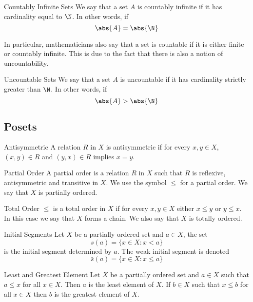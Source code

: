 \begin{defn}{Countably Infinite Sets}{} We say that a set $A$ is countably infinite if it has cardinality equal to $\N$. In other words, if $$\abs{A}=\abs{\N}$$
\end{defn}

In particular, mathematicians also say that a set is countable if it is either finite or countably infinite. This is due to the fact that there is also a notion of uncountability. 

\begin{defn}{Uncountable Sets}{} We say that a set $A$ is uncountable if it has cardinality strictly greater than $\N$. In other words, if $$\abs{A}>\abs{\N}$$
\end{defn}

\subsection{Posets}
\begin{defn}{Antisymmetric}{} A relation $R$ in $X$ is antisymmetric if for every $x,y\in X$, $(x,y)\in R$ and $(y,x)\in R$ implies $x=y$. 
\end{defn}

\begin{defn}{Partial Order}{} A partial order is a relation $R$ in $X$ such that $R$ is reflexive, antisymmetric and transitive in $X$. We use the symbol $\leq$ for a partial order. We say that $X$ is partially ordered. 
\end{defn}

\begin{defn}{Total Order}{} $\leq$ is a total order in $X$ if for every $x,y\in X$ either $x\leq y$ or $y\leq x$. In this case we say that $X$ forms a chain. We also say that $X$ is totally ordered. 
\end{defn}

\begin{defn}{Initial Segments}{} Let $X$ be a partially ordered set and $a\in X$, the set $$s(a)=\{x\in X:x<a\}$$ is the initial segment determined by $a$. The weak initial segment is denoted $$\bar{s}(a)=\{x\in X:x\leq a\}$$ 
\end{defn}

\begin{defn}{Least and Greatest Element}{} Let $X$ be a partially ordered set and $a\in X$ such that $a\leq x$ for all $x\in X$. Then $a$ is the least element of $X$. If $b\in X$ such that $x\leq b$ for all $x\in X$ then $b$ is the greatest element of $X$. 
\end{defn}

